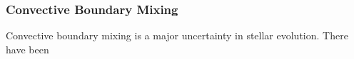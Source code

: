 {\color{purple}
\subsubsection{Convective Boundary Mixing}
}

Convective boundary mixing is a major uncertainty in stellar evolution.  There have been 

